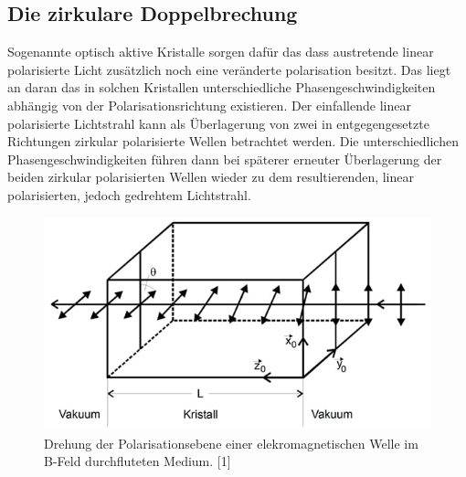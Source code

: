 \subsection{Die zirkulare Doppelbrechung}
\label{sec:zdoppelbrechung}
Sogenannte optisch aktive Kristalle sorgen dafür das dass austretende linear polarisierte Licht zusätzlich noch 
eine veränderte polarisation besitzt. Das liegt an daran das in solchen Kristallen unterschiedliche Phasengeschwindigkeiten
abhängig von der Polarisationsrichtung existieren. Der einfallende linear polarisierte Lichtstrahl kann als Überlagerung von 
zwei in entgegengesetzte Richtungen zirkular polarisierte Wellen betrachtet werden. Die unterschiedlichen 
Phasengeschwindigkeiten führen dann bei späterer erneuter Überlagerung der beiden zirkular polarisierten Wellen wieder
zu dem resultierenden, linear polarisierten, jedoch gedrehtem Lichtstrahl.

\begin{figure}
  \centering
  \includegraphics[width=1\textwidth]{content/grafiken/kristall.JPG}
  \caption{Drehung der Polarisationsebene einer elekromagnetischen Welle im B-Feld durchfluteten Medium. [1]}
  \label{fig:kristall}
\end{figure}

